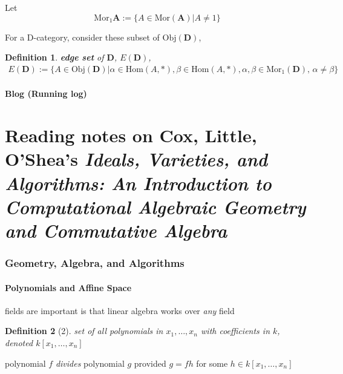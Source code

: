 \documentclass[10pt]{amsart}
\newtheorem{definition}{Definition}
\begin{document}
\begin{multicols*}{2}
Let 
\begin{equation}
\text{Mor}_{1}{\mathbf{A}} := \lbrace A \in \text{Mor}(\mathbf{A}) | A \neq 1 \rbrace 
\end{equation}

For a D-category, consider these subset of $\text{Obj}(\mathbf{D})$, 

\begin{definition}
	\textbf{edge set} of $\mathbf{D}$, $E(\mathbf{D})$, 
\begin{equation}
\begin{gathered}
E(\mathbf{D}) := \lbrace A \in \text{Obj}(\mathbf{D}) | \alpha \in \text{Hom}(A, *), \beta \in \text{Hom}(A, *), \alpha, \beta \in \text{Mor}_{1}(\mathbf{D}), \, \alpha \neq \beta \rbrace
\end{gathered}
\end{equation}	
\end{definition}
	
\subsection{Blog (Running log)}

 
	
	
	

\part{Reading notes on Cox, Little, O'Shea's \emph{Ideals, Varieties, and Algorithms: An Introduction to Computational Algebraic Geometry and Commutative Algebra}}

\section{Geometry, Algebra, and Algorithms}

\subsection{Polynomials and Affine Space}

fields are important is that linear algebra works over \emph{any} field

\begin{definition}[2] set of all polynomials in $x_1 , \dots , x_n$ with coefficients in $k$, denoted $k[x_1, \dots , x_n]$

\end{definition}

polynomial $f$ \emph{divides} polynomial $g$ provided $g= fh$ for some $h \in k[x_1, \dots , x_n ]$


\end{multicols*}
\end{document}
